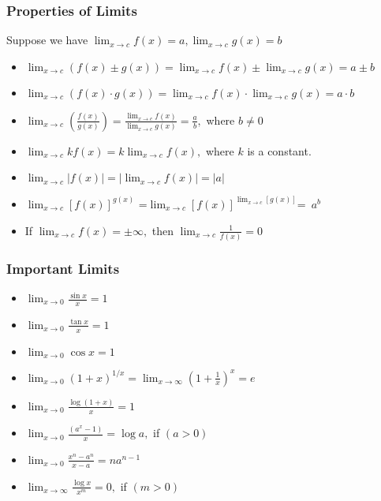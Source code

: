 \subsubsection{Properties of Limits}Suppose we have $\lim _{x \rightarrow c} f(x)=a, \lim _{x \rightarrow c} g(x)=b$ \begin{itemize}
	\item  $\lim _{x \rightarrow c}(f(x) \pm g(x))=\lim _{x \rightarrow c} f(x) \pm \lim _{x \rightarrow c} g(x)=a \pm b$
	\item  $\lim _{x \rightarrow c}(f(x) \cdot g(x))=\lim _{x \rightarrow c} f(x) \cdot \lim _{x \rightarrow c} g(x)=a \cdot b$
	\item $\lim _{x \rightarrow c}\left(\frac{f(x)}{g(x)}\right)=\frac{\lim _{x \rightarrow c} f(x)}{\lim _{x \rightarrow c} g(x)}=\frac{a}{b},$ where $b \neq 0$
	\item  $\lim _{x \rightarrow c} k f(x)=k \lim _{x \rightarrow c} f(x),$ where $k$ is a constant.
	\item  $\lim _{x \rightarrow c}|f(x)|=\left|\lim _{x \rightarrow c} f(x)\right|=|a|$
	\item   $\lim _{x \rightarrow c}\left[ f(x)\right] ^{g(x)}$ =$\lim _{x \rightarrow c}\left[ f(x)\right] ^{\lim _{x \rightarrow c}\left[ g(x)\right] }$=\ $ a^{b}$
	\item  If $\lim _{x \rightarrow c} f(x)=\pm \infty,$ then $\lim _{x \rightarrow c} \frac{1}{f(x)}=0$
\end{itemize}
\subsubsection{Important Limits}
\begin{itemize}
	\item $\lim _{x \rightarrow 0} \frac{\sin x}{x}=1$
	\item $\lim _{x \rightarrow 0} \frac{\tan x}{x}=1$
	\item  $\lim _{x \rightarrow 0} \cos x=1$
	\item $\lim _{x \rightarrow 0}(1+x)^{1 / x}=\lim _{x \rightarrow \infty}\left(1+\frac{1}{x}\right)^{x}=e$
	\item $\lim _{x \rightarrow 0} \frac{\log (1+x)}{x}=1$
	\item $\lim _{x \rightarrow 0} \frac{\left(a^{x}-1\right)}{x}=\log a,$ if $(a>0)$
	\item $\lim _{x \rightarrow 0} \frac{x^{n}-a^{n}}{x-a}=n a^{n-1}$
	\item  $\lim _{x \rightarrow \infty} \frac{\log x}{x^{m}}=0,$ if $(m>0)$
\end{itemize}
